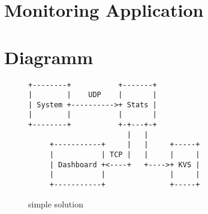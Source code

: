 \section{Monitoring Application}

\section*{Diagramm}

\begin{figure}
\begin{verbatim}
+--------+           +-------+          
|        |    UDP    |       |          
| System +---------->+ Stats |          
|        |           |       |          
+--------+           +-+---+-+          
                       |   |            
     +-----------+     |   |     +-----+
     |           | TCP |   |     |     |
     | Dashboard +<----+   +---->+ KVS |
     |           |               |     |
     +-----------+               +-----+
\end{verbatim}
\caption{simple solution}
\label{fig:ascii-box}
\end{figure}

